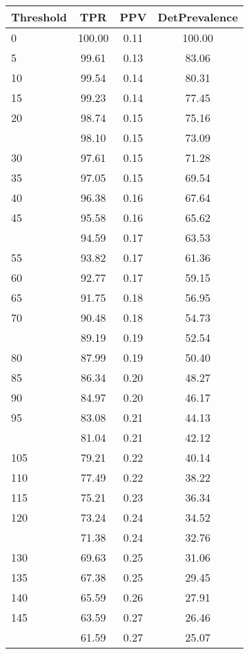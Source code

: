 \begin{table}[ht]
\centering
\begin{tabular}{lccc}
  \toprule
Threshold & TPR & PPV & DetPrevalence \\ 
  \midrule
0 & 100.00 & 0.11 & 100.00 \\ 
  5 & 99.61 & 0.13 & 83.06 \\ 
  10 & 99.54 & 0.14 & 80.31 \\ 
  15 & 99.23 & 0.14 & 77.45 \\ 
  20 & 98.74 & 0.15 & 75.16 \\ 
   \addlinespace
25 & 98.10 & 0.15 & 73.09 \\ 
  30 & 97.61 & 0.15 & 71.28 \\ 
  35 & 97.05 & 0.15 & 69.54 \\ 
  40 & 96.38 & 0.16 & 67.64 \\ 
  45 & 95.58 & 0.16 & 65.62 \\ 
   \addlinespace
50 & 94.59 & 0.17 & 63.53 \\ 
  55 & 93.82 & 0.17 & 61.36 \\ 
  60 & 92.77 & 0.17 & 59.15 \\ 
  65 & 91.75 & 0.18 & 56.95 \\ 
  70 & 90.48 & 0.18 & 54.73 \\ 
   \addlinespace
75 & 89.19 & 0.19 & 52.54 \\ 
  80 & 87.99 & 0.19 & 50.40 \\ 
  85 & 86.34 & 0.20 & 48.27 \\ 
  90 & 84.97 & 0.20 & 46.17 \\ 
  95 & 83.08 & 0.21 & 44.13 \\ 
   \addlinespace
100 & 81.04 & 0.21 & 42.12 \\ 
  105 & 79.21 & 0.22 & 40.14 \\ 
  110 & 77.49 & 0.22 & 38.22 \\ 
  115 & 75.21 & 0.23 & 36.34 \\ 
  120 & 73.24 & 0.24 & 34.52 \\ 
   \addlinespace
125 & 71.38 & 0.24 & 32.76 \\ 
  130 & 69.63 & 0.25 & 31.06 \\ 
  135 & 67.38 & 0.25 & 29.45 \\ 
  140 & 65.59 & 0.26 & 27.91 \\ 
  145 & 63.59 & 0.27 & 26.46 \\ 
   \addlinespace
150 & 61.59 & 0.27 & 25.07 \\ 

\end{tabular}
\end{table}
